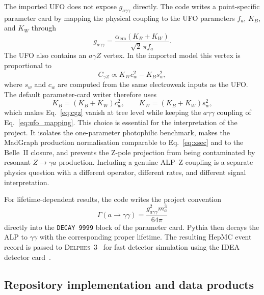 \documentclass[12pt,a4paper]{article}
\newcommand{\gagg}{g_{a\gamma\gamma}}
\begin{document}
The imported UFO does not expose $\gagg$ directly. The code writes a
point-specific parameter card by mapping the physical coupling to the UFO
parameters $f_a$, $K_B$, and $K_W$ through
\begin{equation}
    \gagg=
    \frac{\alpha_\mathrm{em}(K_B+K_W)}
    {\sqrt{2}\,\pi f_a}.
    \label{eq:ufo_mapping}
\end{equation}
The UFO also contains an $a\gamma Z$ vertex. In the imported model this vertex
is proportional to
\begin{equation}
    C_{\gamma Z} \propto K_W c_w^2 - K_B s_w^2,
    \label{eq:cgz}
\end{equation}
where $s_w$ and $c_w$ are computed from the same electroweak inputs as the UFO.
The default parameter-card writer therefore uses
\begin{equation}
    K_B = (K_B+K_W)c_w^2,
    \qquad
    K_W = (K_B+K_W)s_w^2,
    \label{eq:photophilic_split}
\end{equation}
which makes Eq.~\eqref{eq:cgz} vanish at tree level while keeping the
$a\gamma\gamma$ coupling of Eq.~\eqref{eq:ufo_mapping}. This choice is essential
for the interpretation of the project. It isolates the one-parameter
photophilic benchmark, makes the MadGraph production normalisation comparable
to Eq.~\eqref{eq:xsec} and to the Belle~II closure, and prevents the Z-pole
projection from being contaminated by resonant $Z\to\gamma a$ production.
Including a genuine ALP--Z coupling is a separate physics question with a
different operator, different rates, and different signal interpretation.

For lifetime-dependent results, the code writes the project convention
\begin{equation}
    \Gamma(a\to\gamma\gamma)=\frac{\gagg^2 m_a^3}{64\pi}
\end{equation}
directly into the \texttt{DECAY 9999} block of the parameter card. Pythia then decays
the ALP to $\gamma\gamma$ with the corresponding proper lifetime. The resulting
HepMC event record is passed to
\textsc{Delphes~3}~\cite{Delphes} for fast detector simulation using
the IDEA detector card~\cite{IDEA}.

\subsection{Repository implementation and data products}
\end{document}
